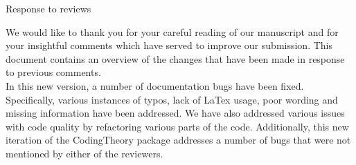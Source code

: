 \documentclass[12pt]{amsart}
\theoremstyle{plain}
\begin{document}
\begin{center}
Response to reviews
\end{center}
We would like to thank you for your careful reading of our manuscript and for your insightful comments which have served to improve our submission. This document contains an overview of the changes that have been made in response to previous comments.
\\

In this new version, a number of documentation bugs have been fixed. Specifically, various instances of typos, lack of LaTex usage, poor wording and missing information have been addressed. We have also addressed various issues with code quality by refactoring various parts of the code. Additionally, this new iteration of the {\ttfamily CodingTheory} package addresses a number of bugs that were not mentioned by either of the reviewers. 
\\
\end{document}
